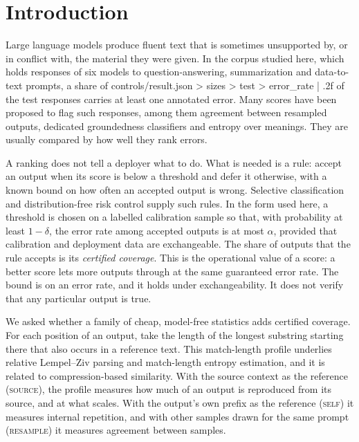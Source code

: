 \documentclass[11pt]{article}
\newcommand{\arm}[1]{\textsc{#1}}
\begin{document}
\section*{Introduction}

Large language models produce fluent text that is sometimes unsupported by, or in conflict with, the material they were given. In the corpus studied here, which holds responses of six models to question-answering, summarization and data-to-text prompts\cite{ragtruth}, a share of {{controls/result.json > sizes > test > error_rate | .2f}} of the test responses carries at least one annotated error. Many scores have been proposed to flag such responses, among them agreement between resampled outputs\cite{selfcheck}, dedicated groundedness classifiers\cite{minicheck} and entropy over meanings\cite{semanticentropy}. They are usually compared by how well they rank errors.

A ranking does not tell a deployer what to do. What is needed is a rule: accept an output when its score is below a threshold and defer it otherwise, with a known bound on how often an accepted output is wrong. Selective classification\cite{geifman} and distribution-free risk control\cite{ltt} supply such rules. In the form used here\cite{mcelveen}, a threshold is chosen on a labelled calibration sample so that, with probability at least $1-\delta$, the error rate among accepted outputs is at most $\alpha$, provided that calibration and deployment data are exchangeable. The share of outputs that the rule accepts is its \emph{certified coverage}. This is the operational value of a score: a better score lets more outputs through at the same guaranteed error rate. The bound is on an error rate, and it holds under exchangeability. It does not verify that any particular output is true.

We asked whether a family of cheap, model-free statistics adds certified coverage. For each position of an output, take the length of the longest substring starting there that also occurs in a reference text. This match-length profile underlies relative Lempel--Ziv parsing\cite{zivmerhav,barnfield} and match-length entropy estimation\cite{kontoyiannis}, and it is related to compression-based similarity\cite{ncd}. With the source context as the reference (\arm{source}), the profile measures how much of an output is reproduced from its source, and at what scales. With the output's own prefix as the reference (\arm{self}) it measures internal repetition, and with other samples drawn for the same prompt (\arm{resample}) it measures agreement between samples.
\end{document}
